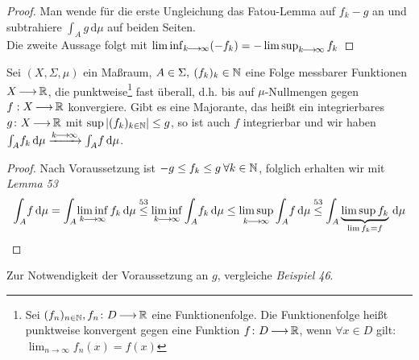 \documentclass[skript.tex]{subfiles}
\begin{document}
		\begin{proof}
			Man wende für die erste Ungleichung das Fatou-Lemma auf $f_k-g$ an und subtrahiere $\int_A \! g \, \mathrm{d}\mu$ auf beiden Seiten. \\
			Die zweite Aussage folgt mit $\liminf_{k\kern -1pt \longrightarrow \kern -1pt\infty}(-f_k)= -\limsup_{k\kern -1pt \longrightarrow \kern -1pt\infty} f_k$
		\end{proof}

		\begin{theorem}
		Sei $(X,\Sigma,\mu)$ ein Maßraum, $A\in\Sigma, \: (f_k)_k\in\mathbb{N}$ eine Folge messbarer Funktionen $X\kern -1pt \longrightarrow \kern -1pt\mathbb{R}$, die punktweise\footnote{Sei $(f_n)_{n\in\mathbb{N}}, f_n\colon D\kern -1pt \longrightarrow \kern -1pt \mathbb{R}$ eine Funktionenfolge. Die Funktionenfolge heißt punktweise konvergent gegen eine Funktion $f\colon D\kern -1pt \longrightarrow \kern -1pt \mathbb{R}$, wenn $\forall x \in D$ gilt: $\lim_{n\to\infty} f_n(x) = f(x)$} fast überall, d.h. bis auf $\mu$-Nullmengen gegen $f:X\kern -1pt \longrightarrow \kern -1pt\mathbb{R}$ konvergiere. Gibt es eine Majorante, das heißt ein integrierbares $g\colon X\kern -1pt \longrightarrow \kern -1pt\mathbb{R}$ mit $\sup|(f_k)_{k\in\mathbb{N}}|\leq g$, so ist auch $f$ integrierbar und wir haben $\int_A \! f_k \, \mathrm{d}\mu \xrightarrow{k\kern -1pt \longrightarrow \kern -1pt\infty}\int_A \! f \, \mathrm{d}\mu$.
		\end{theorem}

		\begin{proof}
			Nach Voraussetzung ist $-g\leq f_k\leq g \: \forall k\in\mathbb{N}$, folglich erhalten wir mit \textit{Lemma 53}
			\begin{equation*}
			\int_A \! f \, \mathrm{d}\mu = \int_A \! \liminf\limits_{k\kern -1pt \longrightarrow \kern -1pt\infty} f_k \, \mathrm{d}\mu \stackrel{53}\leq \liminf\limits_{k\kern -1pt \longrightarrow \kern -1pt\infty} \int_A \! f_k \, \mathrm{d}\mu \leq \limsup\limits_{k\kern -1pt \longrightarrow \kern -1pt\infty} \int_A \! f \, \mathrm{d}\mu \stackrel{53}\leq \int_A \underbrace{\limsup f_k}_{\lim f_k = f} \, \mathrm{d}\mu
			\end{equation*}
		\end{proof}
		Zur Notwendigkeit der Voraussetzung an $g$, vergleiche \textit{Beispiel 46}.
\end{document}
